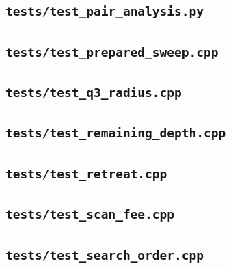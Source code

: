 \subsection*{\texttt{tests/test\_pair\_analysis.py}}

\subsection*{\texttt{tests/test\_prepared\_sweep.cpp}}

\subsection*{\texttt{tests/test\_q3\_radius.cpp}}

\subsection*{\texttt{tests/test\_remaining\_depth.cpp}}

\subsection*{\texttt{tests/test\_retreat.cpp}}

\subsection*{\texttt{tests/test\_scan\_fee.cpp}}

\subsection*{\texttt{tests/test\_search\_order.cpp}}


